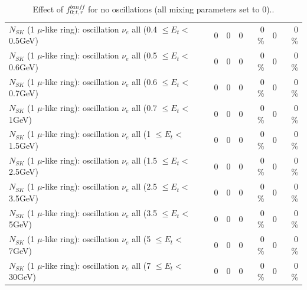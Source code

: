 \begin{table}
\begin{tabular}{| l | r | r | r  r | r  r |}
$N_{SK}$ (1 $\mu$-like ring): oscillation $\nu_{e}$ all (0.4 $\leq E_{t} <$ 0.5GeV) &               0 &               0 &               0 &        0 \%  &               0 &        0 \%  \\ 
$N_{SK}$ (1 $\mu$-like ring): oscillation $\nu_{e}$ all (0.5 $\leq E_{t} <$ 0.6GeV) &               0 &               0 &               0 &        0 \%  &               0 &        0 \%  \\ 
$N_{SK}$ (1 $\mu$-like ring): oscillation $\nu_{e}$ all (0.6 $\leq E_{t} <$ 0.7GeV) &               0 &               0 &               0 &        0 \%  &               0 &        0 \%  \\ 
$N_{SK}$ (1 $\mu$-like ring): oscillation $\nu_{e}$ all (0.7 $\leq E_{t} <$ 1GeV) &               0 &               0 &               0 &        0 \%  &               0 &        0 \%  \\ 
$N_{SK}$ (1 $\mu$-like ring): oscillation $\nu_{e}$ all (1 $\leq E_{t} <$ 1.5GeV) &               0 &               0 &               0 &        0 \%  &               0 &        0 \%  \\ 
$N_{SK}$ (1 $\mu$-like ring): oscillation $\nu_{e}$ all (1.5 $\leq E_{t} <$ 2.5GeV) &               0 &               0 &               0 &        0 \%  &               0 &        0 \%  \\ 
$N_{SK}$ (1 $\mu$-like ring): oscillation $\nu_{e}$ all (2.5 $\leq E_{t} <$ 3.5GeV) &               0 &               0 &               0 &        0 \%  &               0 &        0 \%  \\ 
$N_{SK}$ (1 $\mu$-like ring): oscillation $\nu_{e}$ all (3.5 $\leq E_{t} <$ 5GeV) &               0 &               0 &               0 &        0 \%  &               0 &        0 \%  \\ 
 $N_{SK}$ (1 $\mu$-like ring): oscillation $\nu_{e}$ all (5 $\leq E_{t} <$ 7GeV) &               0 &               0 &               0 &        0 \%  &               0 &        0 \%  \\ 
$N_{SK}$ (1 $\mu$-like ring): oscillation $\nu_{e}$ all (7 $\leq E_{t} <$ 30GeV) &               0 &               0 &               0 &        0 \%  &               0 &        0 \%  \\ 
\hline
\hline
\end{tabular}
\caption{ Effect of $f_{0; t, r}^{banff}$ for no oscillations (all mixing parameters set to 0).. }
\label{tab:num_banff_00_1RmuT_3f_osc_t13:0}
\end{table}
\clearpage
